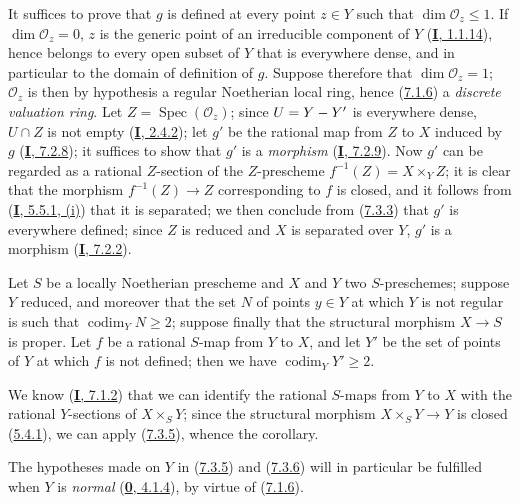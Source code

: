 It suffices to prove that $g$ is defined at every point $z\in Y$ such that
$\dim\mathcal{O}_z\leq1$. If $\dim\mathcal{O}_z=0$, $z$ is the generic point
of an irreducible component of $Y$ (\hyperref[I.1.1.14]{\textbf{I}, 1.1.14}), hence
belongs to every open subset of $Y$ that is everywhere dense, and in particular
to the domain of definition of $g$. Suppose therefore that $\dim\mathcal{O}_z=1$;
$\mathcal{O}_z$ is then by hypothesis a regular Noetherian local ring,
hence (\hyperref[II.7.1.6]{7.1.6}) a \emph{discrete valuation ring}.
Let $Z=\operatorname{Spec}(\mathcal{O}_z)$; since $U=Y- Y'$ is everywhere
dense, $U\cap Z$ is not empty (\hyperref[I.2.4.2]{\textbf{I}, 2.4.2}); let $g'$
be the rational map from $Z$ to $X$ induced by $g$
(\hyperref[I.7.2.8]{\textbf{I}, 7.2.8}); it suffices to show that $g'$ is a
\emph{morphism} (\hyperref[I.7.2.9]{\textbf{I}, 7.2.9}). Now $g'$ can be
regarded as a rational $Z$-section of the $Z$-prescheme
$f^{-1}(Z)=X\times_YZ$; it is clear that the morphism $f^{-1}(Z)\to Z$
corresponding to $f$ is closed, and it follows from
(\hyperref[I.5.5.1]{\textbf{I}, 5.5.1, (i)}) that it is separated; we then conclude from
(\hyperref[II.7.3.3]{7.3.3}) that $g'$ is everywhere defined; since $Z$ is
reduced and $X$ is separated over $Y$, $g'$ is a morphism
(\hyperref[I.7.2.2]{\textbf{I}, 7.2.2}).

\begin{corollary}[7.3.6]
\label{II.7.3.6}
Let $S$ be a locally Noetherian prescheme and $X$ and $Y$ two
$S$-preschemes; suppose $Y$ reduced, and moreover that the set $N$ of
points $y\in Y$ at which $Y$ is not regular is such that
$\operatorname{codim}_YN\geq2$; suppose finally that the structural morphism
$X\to S$ is proper. Let $f$ be a rational $S$-map from $Y$ to
$X$, and let $Y'$ be the set of points of $Y$ at which $f$ is not defined;
then we have $\operatorname{codim}_YY'\geq2$.
\end{corollary}

We know (\hyperref[I.7.1.2]{\textbf{I}, 7.1.2}) that we can identify the
rational $S$-maps from $Y$ to $X$ with the rational $Y$-sections
of $X\times_SY$; since the structural morphism $X\times_SY\to Y$ is closed
(\hyperref[II.5.4.1]{5.4.1}), we can apply
(\hyperref[II.7.3.5]{7.3.5}), whence the corollary.

\begin{remark}[7.3.7]
\label{II.7.3.7}
The hypotheses made on $Y$ in (\hyperref[II.7.3.5]{7.3.5}) and
(\hyperref[II.7.3.6]{7.3.6}) will in particular be fulfilled when $Y$
is \emph{normal} (\hyperref[0.4.1.4]{\textbf{0}, 4.1.4}), by virtue of
(\hyperref[II.7.1.6]{7.1.6}).
\end{remark}

